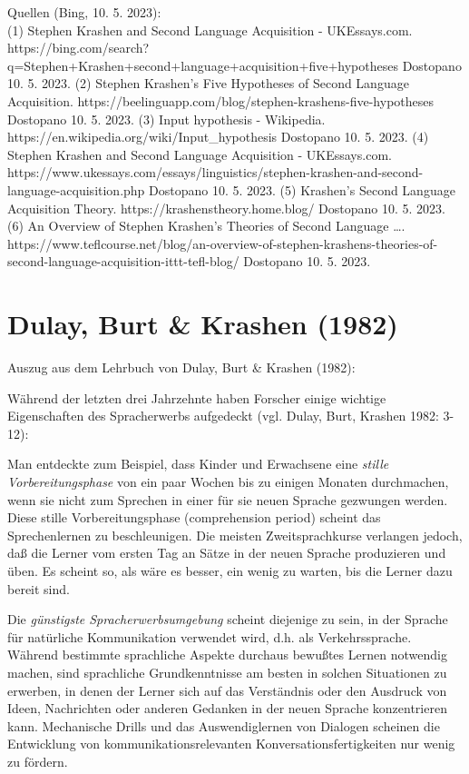 \documentclass[
  letterpaper,
]{scrbook}
\begin{document}
Quellen (Bing, 10. 5. 2023):\\
(1) Stephen Krashen and Second Language Acquisition - UKEssays.com.
https://bing.com/search?q=Stephen+Krashen+second+language+acquisition+five+hypotheses
Dostopano 10. 5. 2023. (2) Stephen Krashen's Five Hypotheses of Second
Language Acquisition.
https://beelinguapp.com/blog/stephen-krashens-five-hypotheses Dostopano
10. 5. 2023. (3) Input hypothesis - Wikipedia.
https://en.wikipedia.org/wiki/Input\_hypothesis Dostopano 10. 5. 2023.
(4) Stephen Krashen and Second Language Acquisition - UKEssays.com.
https://www.ukessays.com/essays/linguistics/stephen-krashen-and-second-language-acquisition.php
Dostopano 10. 5. 2023. (5) Krashen's Second Language Acquisition Theory.
https://krashenstheory.home.blog/ Dostopano 10. 5. 2023. (6) An Overview
of Stephen Krashen's Theories of Second Language \ldots.
https://www.teflcourse.net/blog/an-overview-of-stephen-krashens-theories-of-second-language-acquisition-ittt-tefl-blog/
Dostopano 10. 5. 2023.

\hypertarget{dulay-burt-krashen-1982}{%
\section{Dulay, Burt \& Krashen (1982)}\label{dulay-burt-krashen-1982}}

Auszug aus dem Lehrbuch von Dulay, Burt \& Krashen (1982):

Während der letzten drei Jahrzehnte haben Forscher einige wichtige
Eigenschaften des Spracherwerbs aufgedeckt (vgl. Dulay, Burt, Krashen
1982: 3-12):

Man entdeckte zum Beispiel, dass Kinder und Erwachsene eine \emph{stille
Vorbereitungsphase} von ein paar Wochen bis zu einigen Monaten
durchmachen, wenn sie nicht zum Sprechen in einer für sie neuen Sprache
gezwungen werden. Diese stille Vorbereitungsphase (comprehension period)
scheint das Sprechenlernen zu beschleunigen. Die meisten
Zweitsprachkurse verlangen jedoch, daß die Lerner vom ersten Tag an
Sätze in der neuen Sprache produzieren und üben. Es scheint so, als wäre
es besser, ein wenig zu warten, bis die Lerner dazu bereit sind.

Die \emph{günstigste Spracherwerbsumgebung} scheint diejenige zu sein,
in der Sprache für natürliche Kommunikation verwendet wird, d.h. als
Verkehrssprache. Während bestimmte sprachliche Aspekte durchaus bewußtes
Lernen notwendig machen, sind sprachliche Grundkenntnisse am besten in
solchen Situationen zu erwerben, in denen der Lerner sich auf das
Verständnis oder den Ausdruck von Ideen, Nachrichten oder anderen
Gedanken in der neuen Sprache konzentrieren kann. Mechanische Drills und
das Auswendiglernen von Dialogen scheinen die Entwicklung von
kommunikationsrelevanten Konversationsfertigkeiten nur wenig zu fördern.
\end{document}
